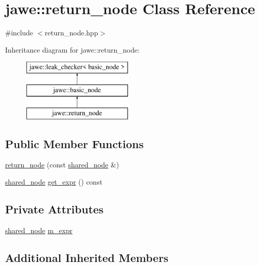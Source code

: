 \hypertarget{classjawe_1_1return__node}{}\section{jawe\+:\+:return\+\_\+node Class Reference}
\label{classjawe_1_1return__node}


{\ttfamily \#include $<$return\+\_\+node.\+hpp$>$}

Inheritance diagram for jawe\+:\+:return\+\_\+node\+:\begin{figure}[H]
\begin{center}
\leavevmode
\includegraphics[height=3.000000cm]{classjawe_1_1return__node}
\end{center}
\end{figure}
\subsection*{Public Member Functions}
\begin{DoxyCompactItemize}
\item 
\hyperlink{classjawe_1_1return__node_a6473fb959a75fefd14730a50528b10da}{return\+\_\+node} (const \hyperlink{namespacejawe_a3f307481d921b6cbb50cc8511fc2b544}{shared\+\_\+node} \&)
\item 
\hyperlink{namespacejawe_a3f307481d921b6cbb50cc8511fc2b544}{shared\+\_\+node} \hyperlink{classjawe_1_1return__node_ab361c0433176d9deb9efefabb1b1c764}{get\+\_\+expr} () const
\end{DoxyCompactItemize}
\subsection*{Private Attributes}
\begin{DoxyCompactItemize}
\item 
\hyperlink{namespacejawe_a3f307481d921b6cbb50cc8511fc2b544}{shared\+\_\+node} \hyperlink{classjawe_1_1return__node_ab2803a023567775a34848949faf323b1}{m\+\_\+expr}
\end{DoxyCompactItemize}
\subsection*{Additional Inherited Members}


